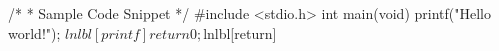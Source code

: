 \begin{listing}
\begin{fcvlabel}[ln:base1]			%
\begin{VerbatimL}[commandchars=\$\[\]]
/*
 * Sample Code Snippet
 */
#include <stdio.h>
int main(void)
{
	printf("Hello world!\n");	$lnlbl[printf]
	return 0;			$lnlbl[return]
}
\end{VerbatimL}
\end{fcvlabel}					%
\caption{示例代码片段}
\label{lst:app:styleguide:Sample Code Snippet}
\end{listing}
